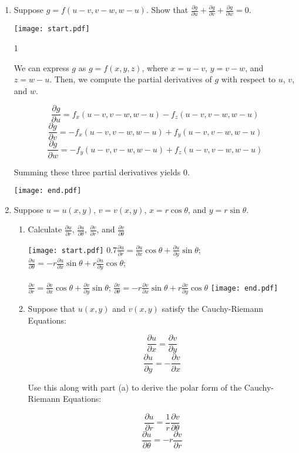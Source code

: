 \documentclass[12pt]{article}
\begin{document}
\begin{enumerate}
\item Suppose $g=f(u-v,v-w,w-u)$.  Show that $\frac{\partial g}{\partial u}+\frac{\partial g}{\partial v}+\frac{\partial g}{\partial w}=0$.

\texttt{[image: start.pdf]}
{{{1\linewidth}{We can express $g$ as $g=f(x,y,z)$, where $x=u-v$, $y=v-w$, and $z=w-u$.  Then, we compute the partial derivatives of $g$ with respect to $u$, $v$, and $w$.

$$\frac{\partial g}{\partial u}=f_x(u-v,v-w,w-u)-f_z(u-v,v-w,w-u)$$
$$\frac{\partial g}{\partial v}=-f_x(u-v,v-w,w-u)+f_y(u-v,v-w,w-u)$$
$$\frac{\partial g}{\partial w}=-f_y(u-v,v-w,w-u)+f_z(u-v,v-w,w-u)$$

Summing these three partial derivatives yields 0.}}}
\texttt{[image: end.pdf]}


\newpage

\item Suppose $u=u(x,y)$, $v=v(x,y)$, $x=r\cos{\theta}$, and $y=r\sin{\theta}$.

\begin{enumerate}

\item Calculate $\frac{\partial u}{\partial r}$, $\frac{\partial u}{\partial \theta}$, $\frac{\partial v}{\partial r}$, and $\frac{\partial v}{\partial \theta}$

\texttt{[image: start.pdf]}
{{{0.7\linewidth}{$\frac{\partial u}{\partial r}=\frac{\partial u}{\partial x}\cos{\theta}+\frac{\partial u}{\partial y}\sin{\theta}$; $\frac{\partial u}{\partial \theta}=-r\frac{\partial u}{\partial x}\sin{\theta}+r\frac{\partial u}{\partial y}\cos{\theta}$;\\
\\
$\frac{\partial v}{\partial r}=\frac{\partial v}{\partial x}\cos{\theta}+\frac{\partial v}{\partial y}\sin{\theta}$; $\frac{\partial v}{\partial \theta}=-r\frac{\partial v}{\partial x}\sin{\theta}+r\frac{\partial v}{\partial y}\cos{\theta}$}}}
\texttt{[image: end.pdf]}


\item Suppose that $u(x,y)$ and $v(x,y)$ satisfy the Cauchy-Riemann Equations:

$$\frac{\partial u}{\partial x}=\frac{\partial v}{\partial y}$$
$$\frac{\partial u}{\partial y}=-\frac{\partial v}{\partial x}$$

Use this along with part (a) to derive the polar form of the Cauchy-Riemann Equations:

$$\frac{\partial u}{\partial r}=\frac{1}{r}\frac{\partial v}{\partial \theta}$$
$$\frac{\partial u}{\partial \theta}=-r\frac{\partial v}{\partial r}$$


\end{enumerate}
\end{enumerate}
\end{document}
